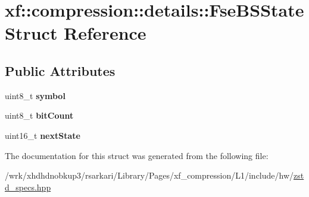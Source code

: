 \hypertarget{structxf_1_1compression_1_1details_1_1FseBSState}{\section{xf\-:\-:compression\-:\-:details\-:\-:Fse\-B\-S\-State Struct Reference}
\label{structxf_1_1compression_1_1details_1_1FseBSState}
}
\subsection*{Public Attributes}
\begin{DoxyCompactItemize}
\item 
\hypertarget{structxf_1_1compression_1_1details_1_1FseBSState_a9d488289f66782dd34b217c4bd0e69f3}{uint8\-\_\-t {\bfseries symbol}}\label{structxf_1_1compression_1_1details_1_1FseBSState_a9d488289f66782dd34b217c4bd0e69f3}

\item 
\hypertarget{structxf_1_1compression_1_1details_1_1FseBSState_a8684516bd49a1fbcf9472100e044648c}{uint8\-\_\-t {\bfseries bit\-Count}}\label{structxf_1_1compression_1_1details_1_1FseBSState_a8684516bd49a1fbcf9472100e044648c}

\item 
\hypertarget{structxf_1_1compression_1_1details_1_1FseBSState_aeb57ea51030f2185be44284aa5d0e045}{uint16\-\_\-t {\bfseries next\-State}}\label{structxf_1_1compression_1_1details_1_1FseBSState_aeb57ea51030f2185be44284aa5d0e045}

\end{DoxyCompactItemize}


The documentation for this struct was generated from the following file\-:\begin{DoxyCompactItemize}
\item 
/wrk/xhdhdnobkup3/rsarkari/\-Library/\-Pages/xf\-\_\-compression/\-L1/include/hw/\hyperlink{zstd__specs_8hpp}{zstd\-\_\-specs.\-hpp}\end{DoxyCompactItemize}
